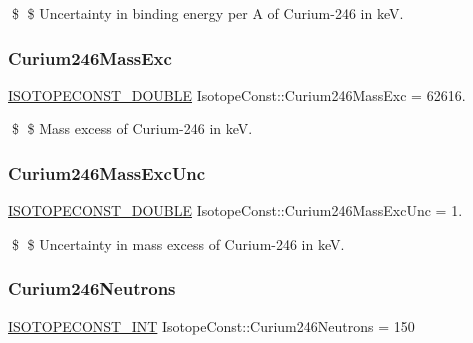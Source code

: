 \$ \$ Uncertainty in binding energy per A of Curium-\/246 in keV. \mbox{\label{group___isotope_const-_curium-_cm246_ga16b3ff329c539d1a7eb7d989e33200f8}} 
\subsubsection{\texorpdfstring{Curium246\+Mass\+Exc}{Curium246MassExc}}
{\footnotesize\ttfamily \mbox{\hyperlink{group___isotope_const-_macros_ga8f45a7272ce02c0b4c65c44636ed719a}{I\+S\+O\+T\+O\+P\+E\+C\+O\+N\+S\+T\+\_\+\+D\+O\+U\+B\+LE}} Isotope\+Const\+::\+Curium246\+Mass\+Exc = 62616.}

\$ \$ Mass excess of Curium-\/246 in keV. \mbox{\label{group___isotope_const-_curium-_cm246_ga044b27d97428029f0b8283c17590cb11}} 
\subsubsection{\texorpdfstring{Curium246\+Mass\+Exc\+Unc}{Curium246MassExcUnc}}
{\footnotesize\ttfamily \mbox{\hyperlink{group___isotope_const-_macros_ga8f45a7272ce02c0b4c65c44636ed719a}{I\+S\+O\+T\+O\+P\+E\+C\+O\+N\+S\+T\+\_\+\+D\+O\+U\+B\+LE}} Isotope\+Const\+::\+Curium246\+Mass\+Exc\+Unc = 1.}

\$ \$ Uncertainty in mass excess of Curium-\/246 in keV. \mbox{\label{group___isotope_const-_curium-_cm246_gaef601c1b5891b0fce43a1e72b2963dd9}} 
\subsubsection{\texorpdfstring{Curium246\+Neutrons}{Curium246Neutrons}}
{\footnotesize\ttfamily \mbox{\hyperlink{group___isotope_const-_macros_ga5f18360b3e99483a35c32d789e62621c}{I\+S\+O\+T\+O\+P\+E\+C\+O\+N\+S\+T\+\_\+\+I\+NT}} Isotope\+Const\+::\+Curium246\+Neutrons = 150}

